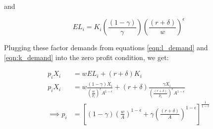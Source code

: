 \documentclass[letterpaper,12pt]{article}
\theoremstyle{definition}
\begin{document}
\begin{spacing}{1.5}
and

\begin{equation}
\label{eqn:l_demand2}
EL_{i} =K_{i}\left(\frac{(1-\gamma)}{\gamma}\right)\left(\frac{(r+\delta)}{w}\right)^{\epsilon}
\end{equation}


Plugging these factor demands from equations \ref{eqn:l_demand} and \ref{eqn:k_demand} into the zero profit condition, we get:

\begin{equation}
\label{eqn:prices}
\begin{split}
p_{i}X_{i} &= w EL_{i} + (r+\delta)K_{i} \\
p_{i}X_{i} &= w \frac{(1-\gamma)X_{i}}{\left(\frac{w}{p_{i}}\right)^{\epsilon}A^{1-\epsilon}} + (r+\delta)\frac{\gamma X_{i}}{\left(\frac{(r+\delta)}{p_{i}}\right)^{\epsilon}A^{1-\epsilon}} \\
\implies p_{i} & = \left[(1-\gamma)\left(\frac{w}{A}\right)^{1-\epsilon} + \gamma\left(\frac{(r+\delta)}{A}\right)^{1-\epsilon} \right]^{\frac{1}{1-\epsilon}}
\end{split}
\end{equation}


%
%
%
%
%
%


\end{spacing}
\end{document}
